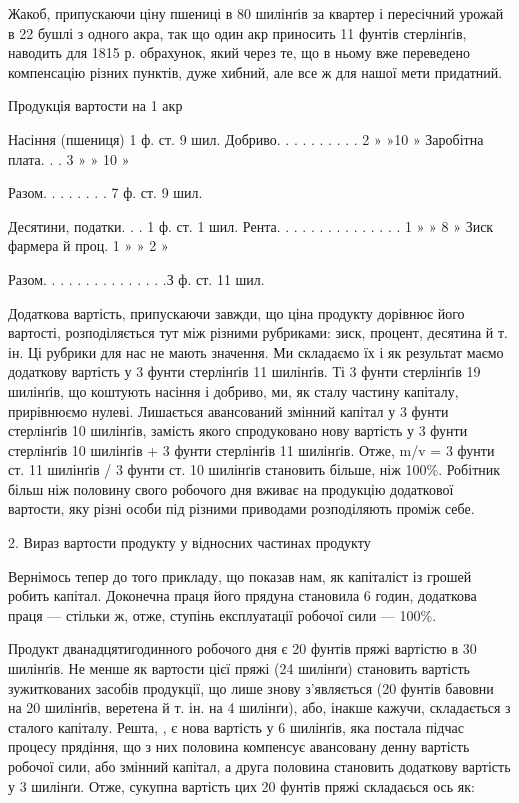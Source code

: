 Жакоб, припускаючи ціну пшениці в 80 шилінґів за квартер і пересічний урожай в 22 бушлі з одного
акра, так що один акр приносить 11 фунтів стерлінґів, наводить для 1815 р. обрахунок, який через те,
що в ньому вже переведено компенсацію різних
пунктів, дуже хибний, але все ж для нашої мети придатний.

Продукція вартости на 1 акр

Насіння (пшениця) 1 ф. ст. 9 шил.
Добриво. . . . . . . . . . 2  » »10 »
Заробітна плата. . . 3 » »  10 »

Разом. . . . . . .  . 7 ф. ст. 9 шил.

Десятини, податки. . . 1 ф. ст. 1 шил.
Рента. . . . . . . . . . . . . . . 1 » » 8 »
Зиск фармера й проц. 1 » » 2 »

Разом. . . . . . . . . . . . . . .З ф. ст. 11 шил.

Додаткова вартість, припускаючи завжди, що ціна продукту дорівнює його вартості, розподіляється тут
між різними рубриками: зиск, процент, десятина й т. ін. Ці рубрики для нас не мають значення. Ми
складаємо їх і як результат маємо додаткову вартість у 3 фунти стерлінґів 11 шилінґів. Ті 3 фунти
стерлінґів 19 шилінґів, що коштують насіння і добриво, ми, як сталу частину капіталу, прирівнюємо
нулеві. Лишається авансований змінний капітал у 3 фунти стерлінґів 10 шилінґів, замість якого
спродуковано нову вартість у 3 фунти стерлінґів 10 шилінґів + 3 фунти стерлінґів 11 шилінґів. Отже,
m/v = 3 фунти ст. 11 шилінґів / 3 фунти ст. 10 шилінґів становить більше, ніж 100\%. Робітник більш
ніж половину свого робочого дня вживає на продукцію додаткової вартости, яку різні особи під різними
приводами  розподіляють проміж себе.

2. Вираз вартости продукту у відносних частинах продукту

Вернімось тепер до того прикладу, що показав нам, як капіталіст із грошей робить капітал. Доконечна
праця його прядуна
становила 6 годин, додаткова праця — стільки ж, отже, ступінь експлуатації робочої сили — 100\%.

Продукт дванадцятигодинного робочого дня є 20 фунтів пряжі вартістю в 30 шилінґів. Не менше як 
вартости цієї пряжі (24 шилінґи) становить вартість зужиткованих засобів продукції, що лише знову
з’являється (20 фунтів бавовни на 20 шилінґів, веретена й т. ін. на 4 шилінґи), або, інакше кажучи,
складається з сталого капіталу. Решта, , є нова вартість у 6 шилінґів, яка постала підчас
процесу прядіння, що з них половина компенсує авансовану денну вартість робочої сили, або змінний
капітал, а друга половина становить додаткову вартість у 3 шилінґи. Отже, сукупна вартість цих 20
фунтів пряжі складаєься ось як:
